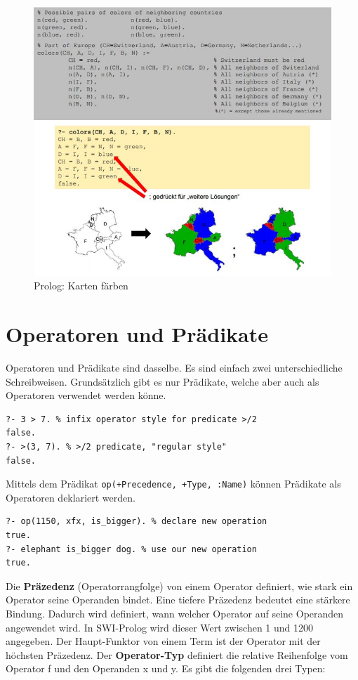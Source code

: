 \begin{figure}[h!]
\centering
\includegraphics[width=1\linewidth]{fig/prolog-karten-faerben}
\caption{Prolog: Karten färben}
\label{fig:prolog-karten-faerben}
\end{figure}

\newpage
\section{Operatoren und Prädikate}
Operatoren und Prädikate sind dasselbe. Es sind einfach zwei unterschiedliche Schreibweisen. Grundsätzlich gibt es nur Prädikate, welche aber auch als Operatoren verwendet werden könne.

\begin{lstlisting}[caption=Prädikat >/2]
?- 3 > 7. % infix operator style for predicate >/2
false.
?- >(3, 7). % >/2 predicate, "regular style"
false.
\end{lstlisting}

Mittels dem Prädikat \verb|op(+Precedence, +Type, :Name)| können Prädikate als Operatoren deklariert werden.

\begin{lstlisting}[caption=is\_bigger/2 als Operator]
?- op(1150, xfx, is_bigger). % declare new operation
true.
?- elephant is_bigger dog. % use our new operation
true.
\end{lstlisting}

Die \textbf{Präzedenz} (Operatorrangfolge) von einem Operator definiert, wie stark ein Operator seine Operanden bindet. Eine tiefere Präzedenz bedeutet eine stärkere Bindung. Dadurch wird definiert, wann welcher Operator auf seine Operanden angewendet wird. In SWI-Prolog wird dieser Wert zwischen 1 und 1200 angegeben. Der Haupt-Funktor von einem Term ist der Operator mit der höchsten Präzedenz. Der \textbf{Operator-Typ} definiert die relative Reihenfolge vom Operator f und den Operanden x und y. Es gibt die folgenden drei Typen:

